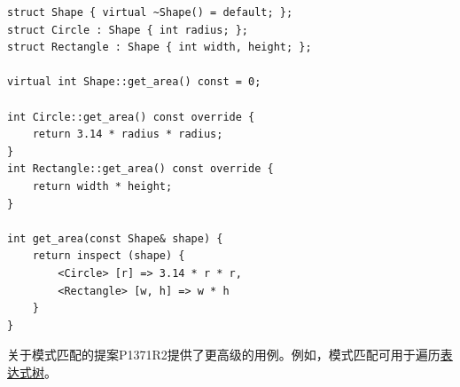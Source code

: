 \begin{itemize}
\begin{lstlisting}[style=styleCXX]
struct Shape { virtual ~Shape() = default; };
struct Circle : Shape { int radius; };
struct Rectangle : Shape { int width, height; };

virtual int Shape::get_area() const = 0;

int Circle::get_area() const override {
	return 3.14 * radius * radius;
}
int Rectangle::get_area() const override {
	return width * height;
}

int get_area(const Shape& shape) {
	return inspect (shape) {
		<Circle> [r] => 3.14 * r * r,
		<Rectangle> [w, h] => w * h
	}
}
\end{lstlisting}
\end{itemize}

关于模式匹配的提案P1371R2提供了更高级的用例。例如，模式匹配可用于遍历\href{https://en.wikipedia.org/wiki/Binary_expression_tree}{表达式树}。








